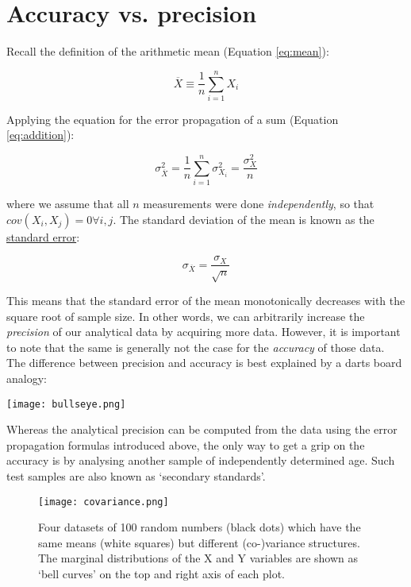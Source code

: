 \documentclass{book}
\newif\ifpdf
\begin{document}
\section{Accuracy vs. precision}

Recall the definition of the arithmetic mean (Equation \ref{eq:mean}):

$$\overline{X} \equiv \frac{1}{n} \sum_{i=1}^{n} X_i$$

Applying the equation for the error propagation of a sum (Equation
\ref{eq:addition}):

\begin{equation}
\sigma_{\overline{X}}^2 = \frac{1}{n} \sum_{i=1}^{n} \sigma^2_{X_i} =
\frac{\sigma^2_X}{n}
\label{eq:varianceofthemean}
\end{equation}

where we assume that all $n$ measurements were done
\emph{independently}, so that $cov(X_i,X_j)=0 \forall i, j$.  The
standard deviation of the mean is known as the \underline{standard
  error}:

\begin{equation}
\sigma_{\overline{X}} = \frac{\sigma_X}{\sqrt{n}}
\label{eq:standarderror}
\end{equation}

This means that the standard error of the mean monotonically decreases
with the square root of sample size. In other words, we can
arbitrarily increase the \emph{precision} of our analytical data by
acquiring more data. However, it is important to note that the same is
generally not the case for the \emph{accuracy} of those data. The
difference between precision and accuracy is best explained by a darts
board analogy:\\

\noindent
\begin{minipage}{\textwidth}
  \centering
  \ifpdf
  \def\svgwidth{\textwidth}
  
  \else
  \texttt{[image: bullseye.png]}
  \fi
\end{minipage}

\bigskip

Whereas the analytical precision can be computed from the data using
the error propagation formulas introduced above, the only way to get a
grip on the accuracy is by analysing another sample of independently
determined age. Such test samples are also known as `secondary
standards'.

\begin{figure}[!ht]
  \centering
  \ifpdf
  \def\svgwidth{\textwidth}
  
  \else
  \texttt{[image: covariance.png]}
  \fi
  \caption{Four datasets of 100 random numbers (black dots) which have
    the same means (white squares) but different (co-)variance
    structures. The marginal distributions of the X and Y variables
    are shown as `bell curves' on the top and right axis of each
    plot.}
  \label{fig:covariance}
\end{figure}
\end{document}
